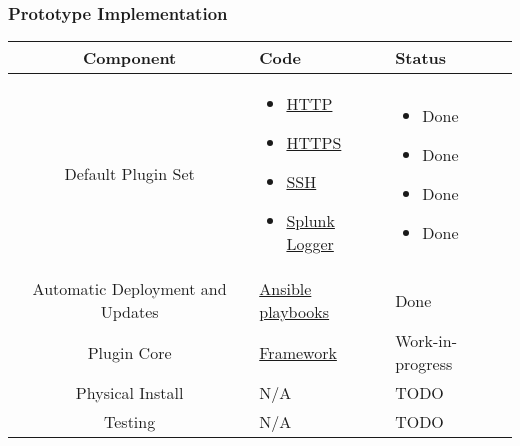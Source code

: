 \begin{frame}
\frametitle{Prototype Implementation}

\begin{table}
\centering
\small
\begin{tabularx}{\linewidth}{c X X}
\toprule
\textbf{Component} & \textbf{Code} & \textbf{Status} \\
\midrule
Default Plugin Set & \begin{itemize}[leftmargin=-0.3mm,after=\vspace{-\baselineskip},noitemsep,nolistsep]
                         \item[] \href{https://github.com/Senior-Design-May1601/webauth}{HTTP}
                         \item[] \href{https://github.com/Senior-Design-May1601/webauth}{HTTPS}
                         \item[] \href{https://github.com/Senior-Design-May1601/fssh}{SSH}
                         \item[] \href{https://github.com/Senior-Design-May1601/Splunk}{Splunk Logger}
                     \end{itemize} &
                    \begin{itemize}[leftmargin=-0.3mm,after=\vspace{-\baselineskip},noitemsep,nolistsep]
                         \item[] \textcolor{ao(english)}{Done}
                         \item[] \textcolor{ao(english)}{Done}
                         \item[] \textcolor{ao(english)}{Done}
                         \item[] \textcolor{ao(english)}{Done}
                     \end{itemize} \\ \hline
Automatic Deployment and Updates & \href{https://github.com/Senior-Design-May1601/config}{Ansible playbooks} & \textcolor{ao(english)}{Done} \\ \hline
Plugin Core & \href{https://github.com/Senior-Design-May1601/projectmain}{Framework} & \textcolor{aureolin}{Work-in-progress} \\ \hline
Physical Install & N/A & \textcolor{bostonuniversityred}{TODO} \\ \hline
Testing & N/A & \textcolor{bostonuniversityred}{TODO} \\
\bottomrule
\end{tabularx}
\end{table}
\end{frame}
